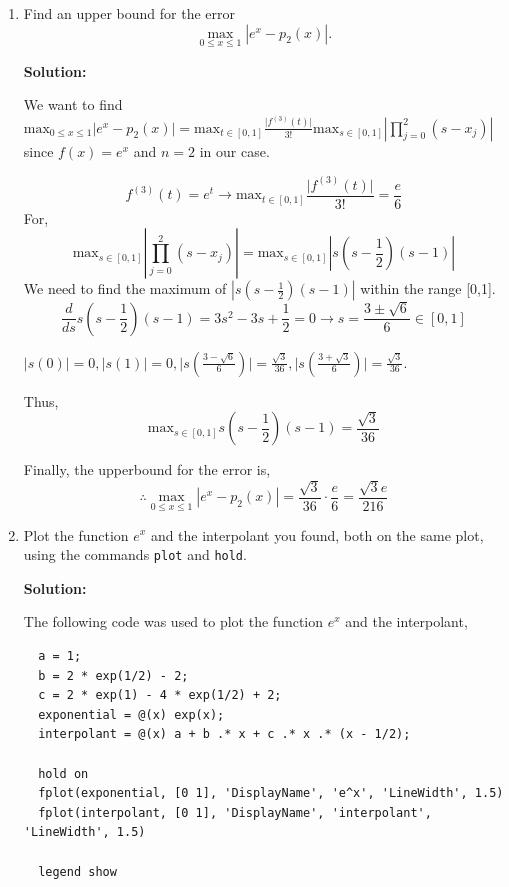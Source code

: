\documentclass[11pt]{article}
\newenvironment{solution}
  {\par\noindent\textbf{Solution:}\par}
  {\par}
\begin{document}
\begin{enumerate}
\begin{enumerate}
\begin{solution}
  Therefore, our interpolating polynomial is $p_2(x) = 1 + (2e^{\frac{1}{2}}-2)x + (2e-4e^{\frac{1}{2}} + 2)x(x-\frac{1}{2})$.
  \end{solution}
\item Find an upper bound for  the error
$$ \max_{0 \le x \le 1} | e^x - p_2(x)|.$$

\begin{solution}
  We want to find 
  $\text{max}_{0 \le x \le 1} \vert e^x - p_2(x) \vert = \text{max}_{t \in [0,1]} \frac{\vert f^{(3)}(t)\vert}{3!}\text{max}_{s \in [0,1]}\left| \prod_{j=0}^2 (s-x_j) \right|$ since $f(x)=e^x$ and $n=2$ in our case.

  $$f^{(3)}(t) = e^t \to  \text{max}_{t \in [0,1]} \frac{\vert f^{(3)}(t)\vert}{3!} = \frac{e}{6}$$
  For,
  $$ \text{max}_{s \in [0,1]}\left| \prod_{j=0}^2 (s-x_j) \right| = \text{max}_{s \in [0,1]} \left| s(s-\frac{1}{2})(s-1) \right| $$
  We need to find the maximum of $\left| s(s-\frac{1}{2})(s-1) \right| $ within the range [0,1]. 
  $$\frac{d}{ds}s(s-\frac{1}{2})(s-1) = 3s^2-3s+\frac{1}{2} = 0 \to s = \frac{3 \pm \sqrt{6}}{6} \in [0,1] $$ 
  
  $\left| s(0) \right| = 0, \left| s(1) \right| = 0,  \vert s(\frac{3-\sqrt{6}}{6}) \vert = \frac{\sqrt{3}}{36} ,  \vert s(\frac{3+\sqrt{3}}{6}) \vert = \frac{\sqrt{3}}{36}$.

  Thus,
  $$  \text{max}_{s \in [0,1]} s(s-\frac{1}{2})(s-1) = \frac{\sqrt{3}}{36}$$

  Finally, the upperbound for the error is,
  $$ \therefore  \max_{0 \le x \le 1} | e^x - p_2(x)| = \frac{\sqrt{3}}{36} \cdot \frac{e}{6} = \frac{\sqrt{3}e}{216} $$

\end{solution}

\item Plot the function $e^x$ and the interpolant you found, both on the
same plot, using the commands {\tt plot} and  {\tt hold}.
\begin{solution}
  The following code was used to plot the function $e^x$ and the interpolant,
  \begin{verbatim}
  a = 1;
  b = 2 * exp(1/2) - 2;
  c = 2 * exp(1) - 4 * exp(1/2) + 2;
  exponential = @(x) exp(x);
  interpolant = @(x) a + b .* x + c .* x .* (x - 1/2);

  hold on
  fplot(exponential, [0 1], 'DisplayName', 'e^x', 'LineWidth', 1.5)
  fplot(interpolant, [0 1], 'DisplayName', 'interpolant', 'LineWidth', 1.5)

  legend show


\end{verbatim}
\end{solution}
\end{enumerate}
\end{enumerate}
\end{document}
